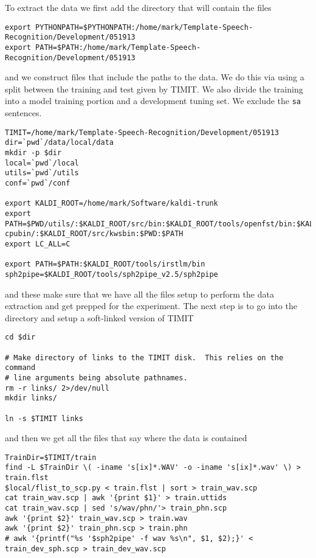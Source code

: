 \documentclass{article}
\begin{document}
To extract the data we first add the directory that will contain the files
\begin{verbatim}
export PYTHONPATH=$PYTHONPATH:/home/mark/Template-Speech-Recognition/Development/051913
export PATH=$PATH:/home/mark/Template-Speech-Recognition/Development/051913
\end{verbatim}
and we construct files that include the paths to the data.
We do this via using a split between the training and test given
by TIMIT. We also divide the training into a model training portion
and a development tuning set.  We exclude the \texttt{sa} sentences.
\begin{verbatim}
TIMIT=/home/mark/Template-Speech-Recognition/Development/051913
dir=`pwd`/data/local/data
mkdir -p $dir
local=`pwd`/local
utils=`pwd`/utils
conf=`pwd`/conf

export KALDI_ROOT=/home/mark/Software/kaldi-trunk
export PATH=$PWD/utils/:$KALDI_ROOT/src/bin:$KALDI_ROOT/tools/openfst/bin:$KALDI_ROOT/tools/irstlm/bin/:$KALDI_ROOT/src/fstbin/:$KALDI_ROOT/src/gmmbin/:$KALDI_ROOT/src/featbin/:$KALDI_ROOT/src/lm/:$KALDI_ROOT/src/sgmmbin/:$KALDI_ROOT/src/sgmm2bin/:$KALDI_ROOT/src/fgmmbin/:$KALDI_ROOT/src/latbin/:$KALDI_ROOT/src/nnetbin:$KALDI_ROOT/src/nnet-cpubin/:$KALDI_ROOT/src/kwsbin:$PWD:$PATH
export LC_ALL=C

export PATH=$PATH:$KALDI_ROOT/tools/irstlm/bin
sph2pipe=$KALDI_ROOT/tools/sph2pipe_v2.5/sph2pipe
\end{verbatim}
and these make sure that we have all the files setup to 
perform the data extraction and get prepped for the experiment.
The next step is to go into the directory and setup a soft-linked
version of TIMIT
\begin{verbatim}
cd $dir

# Make directory of links to the TIMIT disk.  This relies on the command
# line arguments being absolute pathnames.
rm -r links/ 2>/dev/null
mkdir links/

ln -s $TIMIT links
\end{verbatim}
and then we get all the files that say where the data is contained
\begin{verbatim}
TrainDir=$TIMIT/train
find -L $TrainDir \( -iname 's[ix]*.WAV' -o -iname 's[ix]*.wav' \) > train.flst
$local/flist_to_scp.py < train.flst | sort > train_wav.scp
cat train_wav.scp | awk '{print $1}' > train.uttids
cat train_wav.scp | sed 's/wav/phn/'> train_phn.scp
awk '{print $2}' train_wav.scp > train.wav
awk '{print $2}' train_phn.scp > train.phn
# awk '{printf("%s '$sph2pipe' -f wav %s\n", $1, $2);}' < train_dev_sph.scp > train_dev_wav.scp
\end{verbatim}
\end{document}
